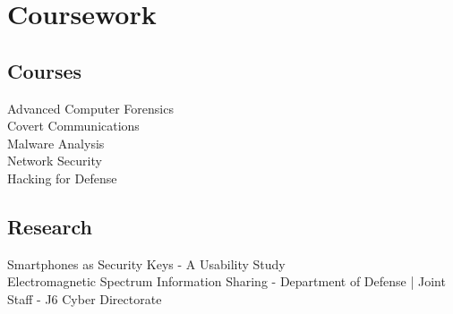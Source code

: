 \documentclass[letterpaper]{deedy-resume} %
\begin{document}
\begin{minipage}[t]{0.28\textwidth}



\section{Coursework}

\subsection{Courses}

Advanced Computer Forensics \\
Covert Communications \\
Malware Analysis \\
Network Security \\
Hacking for Defense

\sectionspace %



\subsection{Research}
Smartphones as Security Keys - A Usability Study \textbullet{} \\
Electromagnetic Spectrum Information Sharing - Department of Defense | Joint Staff - J6 Cyber Directorate \\

\sectionspace %




\end{minipage}
\end{document}
